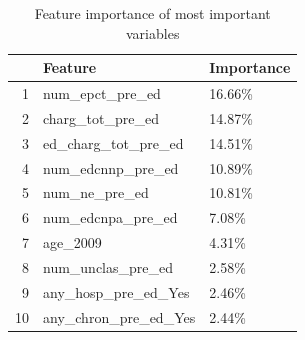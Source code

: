 \begin{table}[!ht]
  \centering
  \begin{tabular}{rll}
    \hline
   & Feature & Importance \\ 
    \hline
    1 & num\_epct\_pre\_ed & 16.66\% \\ 
    2 & charg\_tot\_pre\_ed & 14.87\% \\ 
    3 & ed\_charg\_tot\_pre\_ed & 14.51\% \\ 
    4 & num\_edcnnp\_pre\_ed & 10.89\% \\ 
    5 & num\_ne\_pre\_ed & 10.81\% \\ 
    6 & num\_edcnpa\_pre\_ed & 7.08\% \\ 
    7 & age\_2009 & 4.31\% \\ 
    8 & num\_unclas\_pre\_ed & 2.58\% \\ 
    9 & any\_hosp\_pre\_ed\_Yes & 2.46\% \\ 
    10 & any\_chron\_pre\_ed\_Yes & 2.44\% \\ 
     \hline
  \end{tabular}
  
  \caption{\label{tab:feature_importance} Feature importance of most important variables}
  \end{table}

\newpage
